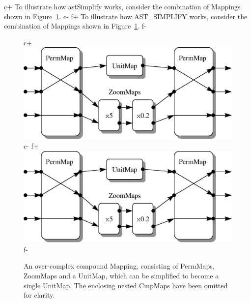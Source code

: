 \documentclass[twoside,11pt]{article}
\newenvironment{latexonly}{}{}
\begin{document}
\begin{latexonly}
c+
   To illustrate how astSimplify works, consider the combination of
   Mappings shown in Figure~\ref{fig:simplifyexample}.
c-
f+
   To illustrate how AST\_SIMPLIFY works, consider the combination of
   Mappings shown in Figure~\ref{fig:simplifyexample}.
f-
   \begin{figure}
   \begin{center}
c+
   \includegraphics[scale=0.65]{sun211_figures/simpexamp.eps}
c-
f+
   \includegraphics[scale=0.65]{sun210_figures/simpexamp.eps}
f-
   \caption{An over-complex compound Mapping, consisting of PermMaps,
   ZoomMaps and a UnitMap, which can be simplified to become a single
   UnitMap.  The enclosing nested CmpMaps have been omitted for clarity.}
   \label{fig:simplifyexample}
   \end{center}
   \end{figure}
\end{latexonly}
\end{document}
